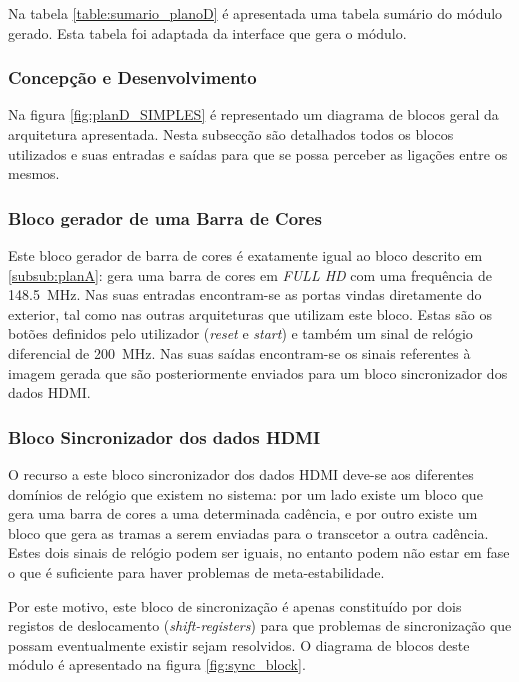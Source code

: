 Na tabela \ref {table:sumario_planoD} é apresentada uma tabela sumário do módulo gerado. Esta tabela foi adaptada da interface que gera o módulo.

\subsubsection{Concepção e Desenvolvimento}

Na figura \ref{fig:planD_SIMPLES} é representado um diagrama de blocos geral da arquitetura apresentada. Nesta subsecção são detalhados todos os blocos utilizados e suas entradas e saídas para que se possa perceber as ligações entre os mesmos. 

\subsubsection*{Bloco gerador de uma Barra de Cores} \label{subsub:serial_colorBarGenerator}

Este bloco gerador de barra de cores é exatamente igual ao bloco descrito em \ref{subsub:planA}: gera uma barra de cores em \textit{FULL HD} com uma frequência de \SI{148.5}{\mega\hertz}. Nas suas entradas encontram-se as portas vindas diretamente do exterior, tal como nas outras arquiteturas que utilizam este bloco. Estas são os botões definidos pelo utilizador (\textit{reset} e \textit{start}) e também um sinal de relógio diferencial de \SI{200}{\mega\hertz}. Nas suas saídas encontram-se os sinais referentes à imagem gerada que são posteriormente enviados para um bloco sincronizador dos dados HDMI.

\subsubsection*{Bloco Sincronizador dos dados HDMI} \label{subsub:serial_syncsignals}

O recurso a este bloco sincronizador dos dados HDMI deve-se aos diferentes domínios de relógio que existem no sistema: por um lado existe um bloco que gera uma barra de cores a uma determinada cadência, e por outro existe um bloco que gera as tramas a serem enviadas para o transcetor a outra cadência. Estes dois sinais de relógio podem ser iguais, no entanto podem não estar em fase o que é suficiente para haver problemas de meta-estabilidade. 

Por este motivo, este bloco de sincronização é apenas constituído por dois registos de deslocamento (\textit{shift-registers}) para que problemas de sincronização que possam eventualmente existir sejam resolvidos. O diagrama de blocos deste módulo é apresentado na figura \ref{fig:sync_block}. 

